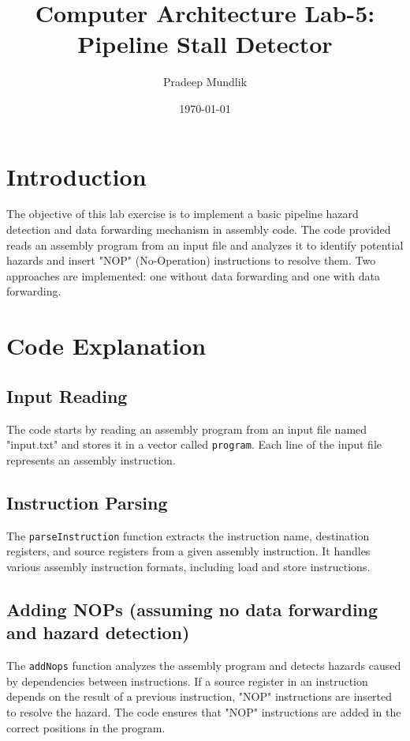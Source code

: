 \documentclass{article}
\title{Computer Architecture Lab-5: Pipeline Stall Detector}
\author{Pradeep Mundlik}
\date{\today}
\begin{document}
\maketitle

\section{Introduction}

The objective of this lab exercise is to implement a basic pipeline hazard detection and data forwarding mechanism in assembly code. The code provided reads an assembly program from an input file and analyzes it to identify potential hazards and insert "NOP" (No-Operation) instructions to resolve them. Two approaches are implemented: one without data forwarding and one with data forwarding.

\section{Code Explanation}

\subsection{Input Reading}

The code starts by reading an assembly program from an input file named "input.txt" and stores it in a vector called \texttt{program}. Each line of the input file represents an assembly instruction.

\subsection{Instruction Parsing}

The \texttt{parseInstruction} function extracts the instruction name, destination registers, and source registers from a given assembly instruction. It handles various assembly instruction formats, including load and store instructions.

\subsection{Adding NOPs (assuming no data forwarding and hazard detection)}

The \texttt{addNops} function analyzes the assembly program and detects hazards caused by dependencies between instructions. If a source register in an instruction depends on the result of a previous instruction, "NOP" instructions are inserted to resolve the hazard. The code ensures that "NOP" instructions are added in the correct positions in the program.
\end{document}
